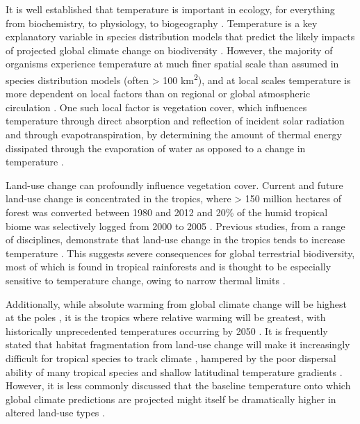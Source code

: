 \documentclass[12pt,a4paper,]{report}
\theoremstyle{definition}
\theoremstyle{definition}
\theoremstyle{definition}
\theoremstyle{remark}
\begin{document}
It is well established that temperature is important in ecology, for
everything from biochemistry, to physiology, to biogeography
\citep{thomas_extinction2004, kearney_potential2009, kingsolver_welltemperatured2009, puurtinen_temperature-dependent2015}.
Temperature is a key explanatory variable in species distribution models
that predict the likely impacts of projected global climate change on
biodiversity \citep[e.g.][]{thomas_extinction2004}. However, the
majority of organisms experience temperature at much finer spatial scale
\citep{gillingham_relative2010, suggitt_habitat2011} than assumed in
species distribution models (often \textgreater{} 100
km\textsuperscript{2}), and at local scales temperature is more
dependent on local factors \citep{suggitt_habitat2011} than on regional
or global atmospheric circulation
\citep{oke_boundary1987, davin_climatic2010, wiens_matching2010, pielke_land2011}.
One such local factor is vegetation cover, which influences temperature
through direct absorption and reflection of incident solar radiation
\citep{oke_boundary1987, murcia_edge1995, snyder_analyzing2004} and
through evapotranspiration, by determining the amount of thermal energy
dissipated through the evaporation of water as opposed to a change in
temperature
\citep{oke_boundary1987, findell_modeled2007, lawrence_effects2015}.

Land-use change can profoundly influence vegetation cover. Current and
future land-use change is concentrated in the tropics, where
\textgreater{} 150 million hectares of forest was converted between 1980
and 2012 \citep{gibbs_tropical2010, hansen_high-resolution2013} and 20\%
of the humid tropical biome was selectively logged from 2000 to 2005
\citep{asner_contemporary2009}. Previous studies, from a range of
disciplines, demonstrate that land-use change in the tropics tends to
increase temperature
\citep{findell_modeled2007, loarie_velocity2009, davin_climatic2010, luskin_microclimate2011, pielke_land2011, ramdani_local2014, lawrence_effects2015}.
This suggests severe consequences for global terrestrial biodiversity,
most of which is found in tropical rainforests
\citep{myers_biodiversity2000} and is thought to be especially sensitive
to temperature change, owing to narrow thermal limits
\citep{deutsch_impacts2008, tewksbury_putting2008, kingsolver_welltemperatured2009}.

Additionally, while absolute warming from global climate change will be
highest at the poles \citep{ipcc_2013}, it is the tropics where relative
warming will be greatest, with historically unprecedented temperatures
occurring by 2050 \citep{mora_projected2013}. It is frequently stated
that habitat fragmentation from land-use change will make it
increasingly difficult for tropical species to track climate
\citep{brook_synergies2008, scriven_protected2015}, hampered by the poor
dispersal ability of many tropical species
\citep{van_houtan_dispersal2007} and shallow latitudinal temperature
gradients \citep{colwell_global2008}. However, it is less commonly
discussed that the baseline temperature onto which global climate
predictions are projected might itself be dramatically higher in altered
land-use types \citep{foster_establishing2011, tuff_framework2016}.
\end{document}
